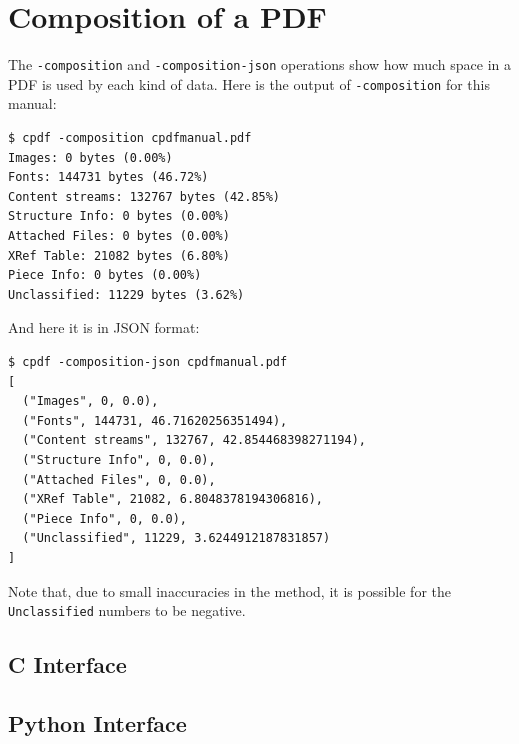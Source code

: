 \documentclass{book}
\begin{document}
\section{Composition of a PDF}

The \texttt{-composition} and \texttt{-composition-json} operations show how much space in a PDF is used by each kind of data. Here is the output of \texttt{-composition} for this manual:

\begin{framed}\small\begin{verbatim}$ cpdf -composition cpdfmanual.pdf
Images: 0 bytes (0.00%)
Fonts: 144731 bytes (46.72%)
Content streams: 132767 bytes (42.85%)
Structure Info: 0 bytes (0.00%)
Attached Files: 0 bytes (0.00%)
XRef Table: 21082 bytes (6.80%)
Piece Info: 0 bytes (0.00%)
Unclassified: 11229 bytes (3.62%)
\end{verbatim}
\end{framed}\pagestyle{empty}\thispagestyle{fancy}

\noindent And here it is in JSON format:

\begin{framed}\small\begin{verbatim}$ cpdf -composition-json cpdfmanual.pdf
[
  ("Images", 0, 0.0),
  ("Fonts", 144731, 46.71620256351494),
  ("Content streams", 132767, 42.854468398271194),
  ("Structure Info", 0, 0.0),
  ("Attached Files", 0, 0.0),
  ("XRef Table", 21082, 6.8048378194306816),
  ("Piece Info", 0, 0.0),
  ("Unclassified", 11229, 3.6244912187831857)
]
\end{verbatim}
\end{framed}\pagestyle{empty}\thispagestyle{fancy}

\noindent Note that, due to small inaccuracies in the method, it is possible for the \texttt{Unclassified} numbers to be negative.

\begin{cpdflib}
\clearpage
\section*{C Interface}
\begin{small}\tt

\end{small}
\end{cpdflib}

\begin{pycpdflib}
\clearpage
\section*{Python Interface}
\begin{small}\tt

\end{small}
\end{pycpdflib}
\end{document}
